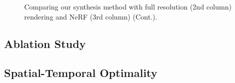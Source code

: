 \begin{figure}[htb]
\begin{minipage}{0.32\linewidth}
    \end{minipage}    
    
    \caption{Comparing our synthesis method with full resolution (2nd column) rendering and NeRF (3rd column) (Cont.).}
    {}
    \label{fig:results:comparison2}
\end{figure}


\subsection{Ablation Study}

\subsection{Spatial-Temporal Optimality}

